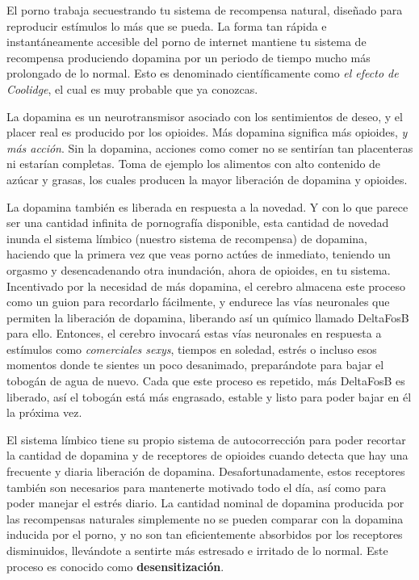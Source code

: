 \documentclass[
  spanish,
  openany]{book}
\begin{document}
El porno trabaja secuestrando tu sistema de recompensa natural, diseñado para reproducir estímulos lo más que se pueda. La forma tan rápida e instantáneamente accesible del porno de internet mantiene tu sistema de recompensa produciendo dopamina por un periodo de tiempo mucho más prolongado de lo normal. Esto es denominado científicamente como \emph{el efecto de Coolidge}, el cual es muy probable que ya conozcas.

La dopamina es un neurotransmisor asociado con los sentimientos de deseo, y el placer real es producido por los opioides. Más dopamina significa más opioides, \emph{y más acción}. Sin la dopamina, acciones como comer no se sentirían tan placenteras ni estarían completas. Toma de ejemplo los alimentos con alto contenido de azúcar y grasas, los cuales producen la mayor liberación de dopamina y opioides.

La dopamina también es liberada en respuesta a la novedad. Y con lo que parece ser una cantidad infinita de pornografía disponible, esta cantidad de novedad inunda el sistema límbico (nuestro sistema de recompensa) de dopamina, haciendo que la primera vez que veas porno actúes de inmediato, teniendo un orgasmo y desencadenando otra inundación, ahora de opioides, en tu sistema. Incentivado por la necesidad de más dopamina, el cerebro almacena este proceso como un guion para recordarlo fácilmente, y endurece las vías neuronales que permiten la liberación de dopamina, liberando así un químico llamado DeltaFosB para ello. Entonces, el cerebro invocará estas vías neuronales en respuesta a estímulos como \emph{comerciales sexys}, tiempos en soledad, estrés o incluso esos momentos donde te sientes un poco desanimado, preparándote para bajar el tobogán de agua de nuevo. Cada que este proceso es repetido, más DeltaFosB es liberado, así el tobogán está más engrasado, estable y listo para poder bajar en él la próxima vez.

El sistema límbico tiene su propio sistema de autocorrección para poder recortar la cantidad de dopamina y de receptores de opioides cuando detecta que hay una frecuente y diaria liberación de dopamina. Desafortunadamente, estos receptores también son necesarios para mantenerte motivado todo el día, así como para poder manejar el estrés diario. La cantidad nominal de dopamina producida por las recompensas naturales simplemente no se pueden comparar con la dopamina inducida por el porno, y no son tan eficientemente absorbidos por los receptores disminuidos, llevándote a sentirte más estresado e irritado de lo normal. Este proceso es conocido como \textbf{desensitización}.
\end{document}
